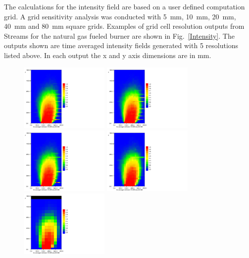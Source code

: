 \documentclass[twoside]{uocthesis}
\begin{document}
{The calculations for the intensity field are based on a user defined computation grid.  A grid sensitivity analysis was conducted with 5~mm, 10~mm, 20~mm, 40~mm and 80~mm square grids.  Examples of grid cell resolution outputs from Streams for the natural gas fueled burner are shown in Fig.~\ref{Intensity}.  The outputs shown are time averaged intensity fields generated with 5 resolutions listed above. In each output the x and y axis dimensions are in mm.

\begin{figure}[p]
	\centering
	\includegraphics[trim=0in 0in 3.5in 0in,clip=true,width=1.7in]{../Figures/FHNG80_1_GS_5mm_10s_color}
	\includegraphics[trim=0in 0in 3.5in 0in,clip=true,width=1.7in]{../Figures/FHNG80_1_GS_10mm_10s_color}\\
	\includegraphics[trim=0in 0in 3.5in 0in,clip=true,width=1.7in]{../Figures/FHNG80_1_GS_20mm_10s_color}
	\includegraphics[trim=0in 0in 3.5in 0in,clip=true,width=1.7in]{../Figures/FHNG80_1_GS_40mm_10s_color}
	\includegraphics[trim=0in 0in 3.5in 0in,clip=true,width=1.7in]{../Figures/FHNG80_1_GS_80mm_10s_color}\\

\end{figure}}
\end{document}
